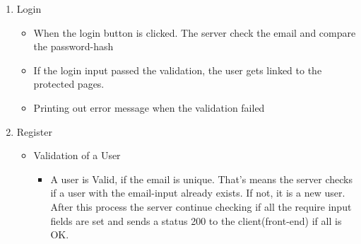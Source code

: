 \begin{enumerate}
    \item Login
    \begin{itemize}
        \item When the login button is clicked. The server check the email and compare the password-hash 
        \item
        If the login input passed the validation, the user gets linked to the protected pages.
        \item
        Printing out error message when the validation failed
    \end{itemize}
    \item Register
    \begin{itemize}
        \item Validation of a User
        \begin{itemize}
            \item 
            A user is Valid, if the email is unique. That's means the server checks if a user with the email-input already exists. If not, it is a new user. After this process the server continue checking if all the require input fields are set and sends a status 200 to the client(front-end) if all is OK. 
        \end{itemize}
        

\end{itemize}
\end{enumerate}
